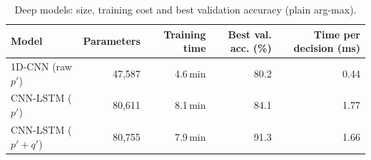 \begin{table}[H]\centering\small
\caption{Deep models: size, training cost and best validation accuracy (plain arg-max).}\label{tab:deep}
\begin{tabular}{lrrrr}\toprule
Model & Parameters & Training time & Best val. acc. (\%) & Time per decision (ms) \\\midrule
1D-CNN (raw $p'$) & 47{,}587 & 4.6\,min & 80.2 & 0.44 \\
CNN-LSTM ($p'$) & 80{,}611 & 8.1\,min & 84.1 & 1.77 \\
CNN-LSTM ($p'+q'$) & 80{,}755 & 7.9\,min & 91.3 & 1.66 \\
\bottomrule\end{tabular}
\end{table}